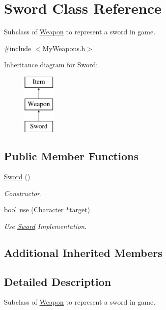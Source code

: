 \hypertarget{classSword}{\section{Sword Class Reference}
\label{classSword}
}


Subclass of \hyperlink{classWeapon}{Weapon} to represent a sword in game.  




{\ttfamily \#include $<$My\-Weapons.\-h$>$}

Inheritance diagram for Sword\-:\begin{figure}[H]
\begin{center}
\leavevmode
\includegraphics[height=3.000000cm]{classSword}
\end{center}
\end{figure}
\subsection*{Public Member Functions}
\begin{DoxyCompactItemize}
\item 
\hyperlink{classSword_af33284e40825ec8ddccd01fa5833be36}{Sword} ()
\begin{DoxyCompactList}\small\item\em Constructor. \end{DoxyCompactList}\item 
bool \hyperlink{classSword_ac9613c1b3c9a3b748c6e36b1285924b9}{use} (\hyperlink{classCharacter}{Character} $\ast$target)
\begin{DoxyCompactList}\small\item\em Use \hyperlink{classSword}{Sword} Implementation. \end{DoxyCompactList}\end{DoxyCompactItemize}
\subsection*{Additional Inherited Members}


\subsection{Detailed Description}
Subclass of \hyperlink{classWeapon}{Weapon} to represent a sword in game. 

